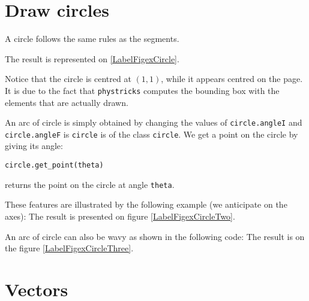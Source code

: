 \section{Draw circles}

A circle follows the same rules as the segments.

The result is represented on \ref{LabelFigexCircle}.
\newcommand{\CaptionFigexCircle}{An example of circle.}

Notice that the circle is centred at $(1,1)$, while it appears centred on the page. It is due to the fact that \verb+phystricks+ computes the bounding box with the elements that are actually drawn.

An arc of circle is simply obtained by changing the values of \verb+circle.angleI+ and \verb+circle.angleF+ is \verb+circle+ is of the class \verb+circle+. We get a point on the circle by giving its angle: 
\begin{verbatim}
circle.get_point(theta) 
\end{verbatim}
returns the point on the circle at angle \verb+theta+. 

These features are illustrated by the following example (we anticipate on the axes):
The result is presented on figure \ref{LabelFigexCircleTwo}.
\newcommand{\CaptionFigexCircleTwo}{Some features of circles.}


An arc of circle can also be wavy as shown in the following code:
The result is on the figure \ref{LabelFigexCircleThree}.
\newcommand{\CaptionFigexCircleThree}{A wavy arc of circle. Notice that the extremities do not glue perfectly. This is not a feature, but a bug.}



\section{Vectors}

